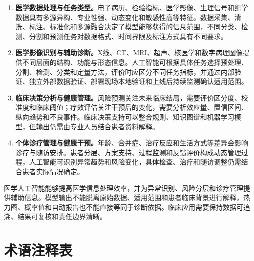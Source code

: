 \begin{enumerate}
\def\labelenumi{\arabic{enumi}.}
\setlength{\itemsep}{3pt}
\item \textbf{医学数据处理与任务类型。}电子病历、检验指标、医学影像、生理信号和组学数据具有多源异构、专业性强、动态变化和敏感性高等特征。数据采集、清洗、标注、标准化和多源融合决定了模型能够获得的信息范围，不同分类、检测、分割和预测任务对数据格式、时间界限及标注方式具有不同要求。
\item \textbf{医学影像识别与辅助诊断。}X线、CT、MRI、超声、核医学和数字病理图像提供不同层面的结构、功能与形态信息。人工智能可根据具体任务选择预处理、分割、检测、分类和定量方法，评价时应区分不同任务指标，并通过内部验证、独立外部数据验证、部署现场本地验证和上线后持续监测确认适用范围。
\item \textbf{临床决策分析与健康管理。}风险预测关注未来临床结局，需要评价区分度、校准度和临床阈值；疗效评估关注干预后的变化，需要分析效应量、置信区间、纵向趋势和不良事件。临床决策支持可以整合规则、知识图谱和机器学习模型，但输出仍需由专业人员结合患者资料解释。
\item \textbf{个体诊疗管理与健康干预。}年龄、合并症、治疗反应和生活方式等差异会影响诊疗与随访安排。患者分层、方案支持、过程监测和反馈评价构成动态管理过程，人工智能可识别异常趋势和风险变化，具体检查、治疗和随访调整仍需结合患者实际情况确定。
\end{enumerate}

医学人工智能能够提高医学信息处理效率，并为异常识别、风险分层和诊疗管理提供辅助信息。模型输出不能脱离原始数据、适用范围和患者临床背景进行解释，热力图、概率值和自动报告也不能直接等同于诊断依据。临床应用需要保持数据可追溯、结果可复核和责任边界清晰。

\clearpage
\section*{术语注释表}

